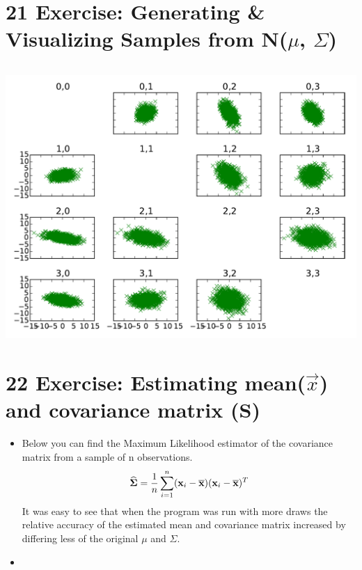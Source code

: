 \documentclass[pdftex,12pt,a4paper]{article}
\begin{document}
\newpage

\section*{21 Exercise: Generating \& Visualizing Samples from N($\mu$, $\Sigma$)}
\inputminted{python}{E21.py}
\begin{center}
\includegraphics[width=\textwidth]{scatter.pdf}
\end{center}
\newpage
\section*{22 Exercise: Estimating mean($\vec{x}$) and covariance matrix (S)}
\begin{itemize}
\item
Below you can find the Maximum Likelihood estimator of the covariance matrix from a sample of n observations.
$$\widehat{\boldsymbol\Sigma} = {1 \over n}\sum_{i=1}^n ({\mathbf x}_i-\overline{\mathbf x})({\mathbf x}_i-\overline{\mathbf x})^T$$
It was easy to see that when the program was run with more draws the relative accuracy of the estimated mean and covariance matrix increased by differing less of the original $\mu$ and $\Sigma$.
\item
\inputminted{python}{E22.py}
\end{itemize}
\end{document}
